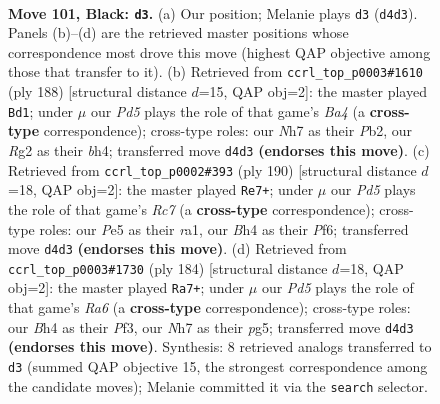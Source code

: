 \documentclass[11pt]{article}
\begin{document}
\clearpage

\begin{figure}[p]\centering
\begin{subfigure}{0.46\textwidth}\centering
\resizebox{\linewidth}{!}{%
\newchessgame
\chessboard[
  setfen={R7/7n/7p/4p2k/1K1p3b/8/6r1/8 b - - 21 101},
  showmover=false,
  pgfstyle=straightmove, color=movearrow, markmove={d4-d3}
]}
\caption{}
\end{subfigure}\hfill
\begin{subfigure}{0.46\textwidth}\centering
\resizebox{\linewidth}{!}{%
\newchessgame
\chessboard[
  setfen={8/8/1k1p4/3P4/B1K2p1b/2P5/1P6/8 w - - 5 95},
  showmover=false,
  pgfstyle=straightmove, color=movearrow, markmove={a4-d1}
]}
\caption{}
\end{subfigure}
\\[4pt]
\begin{subfigure}{0.46\textwidth}\centering
\resizebox{\linewidth}{!}{%
\newchessgame
\chessboard[
  setfen={4k3/2R5/5P2/5K2/5P2/8/8/r7 w - - 33 96},
  showmover=false,
  pgfstyle=straightmove, color=movearrow, markmove={c7-e7}
]}
\caption{}
\end{subfigure}\hfill
\begin{subfigure}{0.46\textwidth}\centering
\resizebox{\linewidth}{!}{%
\newchessgame
\chessboard[
  setfen={8/5k2/R7/6p1/1r6/5PK1/6P1/8 w - - 83 93},
  showmover=false,
  pgfstyle=straightmove, color=movearrow, markmove={a6-a7}
]}
\caption{}
\end{subfigure}
\caption{\textbf{Move 101, Black: \texttt{d3}.} (a) Our position; Melanie plays \texttt{d3} (\texttt{d4d3}). Panels (b)--(d) are the retrieved master positions whose correspondence most drove this move (highest QAP objective among those that transfer to it). (b) Retrieved from \texttt{ccrl\_top\_p0003\#1610} (ply 188) [structural distance $d$=15, QAP obj=2]: the master played \texttt{Bd1}; under $\mu$ our \emph{Pd5} plays the role of that game's \emph{Ba4} (a \textbf{cross-type} correspondence); cross-type roles: our \emph{N}h7 as their \emph{P}b2, our \emph{R}g2 as their \emph{b}h4; transferred move \texttt{d4d3} \textbf{(endorses this move)}. (c) Retrieved from \texttt{ccrl\_top\_p0002\#393} (ply 190) [structural distance $d$=18, QAP obj=2]: the master played \texttt{Re7+}; under $\mu$ our \emph{Pd5} plays the role of that game's \emph{Rc7} (a \textbf{cross-type} correspondence); cross-type roles: our \emph{P}e5 as their \emph{r}a1, our \emph{B}h4 as their \emph{P}f6; transferred move \texttt{d4d3} \textbf{(endorses this move)}. (d) Retrieved from \texttt{ccrl\_top\_p0003\#1730} (ply 184) [structural distance $d$=18, QAP obj=2]: the master played \texttt{Ra7+}; under $\mu$ our \emph{Pd5} plays the role of that game's \emph{Ra6} (a \textbf{cross-type} correspondence); cross-type roles: our \emph{B}h4 as their \emph{P}f3, our \emph{N}h7 as their \emph{p}g5; transferred move \texttt{d4d3} \textbf{(endorses this move)}. Synthesis: 8 retrieved analogs transferred to \texttt{d3} (summed QAP objective 15, the strongest correspondence among the candidate moves); Melanie committed it via the \texttt{search} selector.}
\label{fig:thought-m201}
\end{figure}
\end{document}
